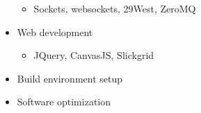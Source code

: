 \documentclass{report}
\begin{document}
\begin{table}[ht!]
\begin{tabular}
\begin{multicols}{2}
\begin{itemize}
                      \begin{itemize}
                          \item Sockets, websockets, 29West, ZeroMQ
                      \end{itemize}
                \item Web development
                      \begin{itemize}
                          \item JQuery, CanvasJS, Slickgrid
                      \end{itemize}
                \item Build environment setup
                \item Software optimization
            \end{itemize}
        \end{multicols} \\
    \end{tabular}
\end{table}
\end{document}
